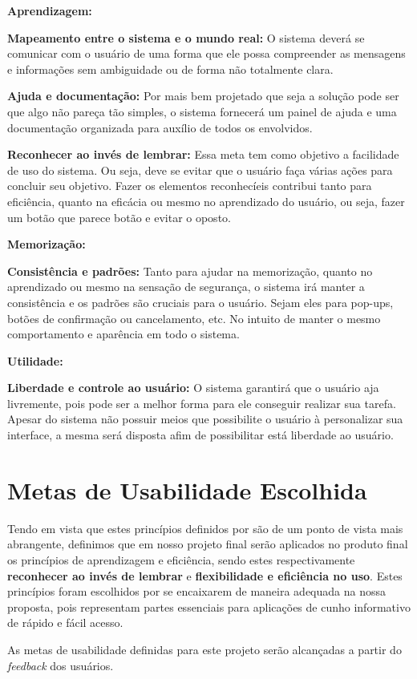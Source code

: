 \vspace{0.4cm}
\textbf{Aprendizagem:}

\hspace{1.3cm}
\textbf{Mapeamento entre o sistema e o mundo real:} O sistema deverá se comunicar com o usuário de uma forma que ele possa compreender as     mensagens e informações sem ambiguidade ou de forma não totalmente  clara.

\hspace{1.3cm}
\textbf{Ajuda e documentação:} Por mais bem projetado que seja a solução pode ser que algo não pareça tão simples, o sistema fornecerá um painel de ajuda e uma documentação organizada para auxílio de todos os envolvidos.

\hspace{1.3cm}
\textbf{Reconhecer ao invés de lembrar:} Essa meta tem como objetivo a facilidade de uso do sistema. Ou seja, deve se evitar que o usuário faça várias ações para concluir seu objetivo. Fazer os elementos reconhecíeis contribui tanto para eficiência, quanto na eficácia ou mesmo no aprendizado do usuário, ou seja, fazer um botão que parece botão e evitar o oposto.

\vspace{0.4cm}
\textbf{Memorização:}

\hspace{1.3cm}
\textbf{Consistência e padrões:} Tanto para ajudar na memorização, quanto no aprendizado ou mesmo na sensação de segurança, o sistema irá manter a consistência e os padrões são cruciais para o usuário. Sejam eles para pop-ups, botões de confirmação ou cancelamento, etc. No intuito de manter o mesmo comportamento e aparência em todo o sistema.
	
\vspace{0.4cm}
\textbf{Utilidade:}

\hspace{1.3cm}
\textbf{Liberdade e controle ao usuário:} O sistema garantirá que o usuário aja livremente, pois pode ser a melhor forma para ele conseguir realizar sua tarefa. Apesar do sistema não possuir meios que possibilite o usuário à personalizar sua interface, a mesma será disposta afim de possibilitar está liberdade ao usuário.


\section{Metas de Usabilidade Escolhida}

Tendo em vista que estes princípios definidos por \cite{Nielsen} são de um ponto de vista mais abrangente, definimos que em nosso projeto final serão aplicados no produto final os princípios de aprendizagem e eficiência, sendo estes respectivamente \textbf{reconhecer ao invés de lembrar} e \textbf{flexibilidade e eficiência no uso}. Estes princípios foram escolhidos por se encaixarem de maneira adequada na nossa proposta, pois representam partes essenciais para aplicações de cunho informativo de rápido e fácil acesso.

As metas de usabilidade definidas para este projeto serão alcançadas a partir do \textit{feedback} dos usuários.
